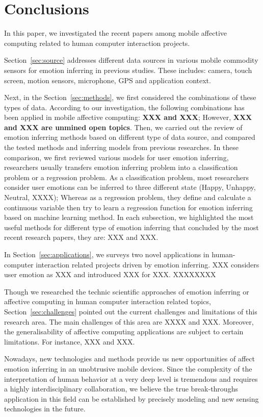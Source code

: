 \section{Conclusions}

In this paper, we investigated the recent papers among mobile affective computing related to human computer interaction projects.

Section~\ref{sec:source} addresses different data sources in various mobile commodity sensors for emotion inferring in previous studies. These includes: camera, touch screen, motion sensors, microphone, GPS and application context. 

Next, in the Section~\ref{sec:methods}, we first considered the combinations of these types of data. According to our investigation, the following combinations has been applied in mobile affective computing: \textbf{XXX and XXX}; However, \textbf{XXX and XXX are unmined open topics}. Then, we carried out the review of emotion inferring methods based on different type of data source, and compared the tested methods and inferring models from previous researches. In these comparison, we first reviewed various models for user emotion inferring, researchers usually transfers emotion inferring problem into a classification problem or a regression problem. As a classification problem, most researchers consider user emotions can be inferred to three different state (Happy, Unhappy, Neutral, XXXX); Whereas as a regression problem, they define and calculate a continuous variable then try to learn a regression function for emotion inferring based on machine learning method. In each subsection, we highlighted the most useful methods for different type of emotion inferring that concluded by the most recent research papers, they are: XXX and XXX.

In Section~\ref{sec:applications}, we surveys two novel applications in human-computer interaction related projects driven by emotion inferring. XXX considers user emotion as XXX and introduced XXX for XXX. XXXXXXXX

Though we researched the technic scientific approaches of emotion inferring or affective computing in human computer interaction related topics, Section~\ref{sec:challenges} pointed out the current challenges and limitations of this research area. The main challenges of this area are XXXX and XXX. Moreover, the generalisability of affective computing applications are subject to certain limitations. For instance, XXX and XXX.

Nowadays, new technologies and methods provide us new opportunities of affect emotion inferring in an unobtrusive mobile devices. Since the complexity of the interpretation of human behavior at a very deep level is tremendous and requires a highly interdisciplinary collaboration, we believe the true break-throughs application in this field can be established by precisely modeling and new sensing technologies in the future.